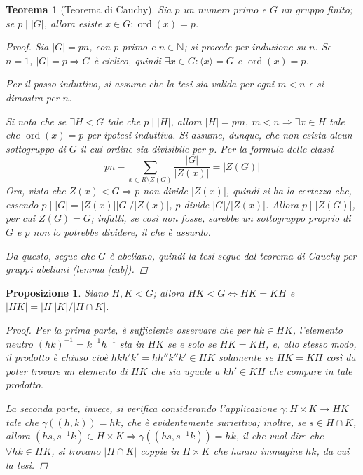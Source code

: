 \documentclass[11pt]{scrartcl}
\theoremstyle{style1}
\newtheorem{teorema}{Teorema}[section]
\newtheorem{prop}{Proposizione}[section]
\numberwithin{equation}{subsection}
\begin{document}
\begin{teorema}
	[Teorema di Cauchy]
	Sia $p$ un numero primo e $G$ un gruppo finito; se $p  \mid |G|$, allora esiste $x \in G : \operatorname{ord}(x) = p $.
	\begin{proof}
		Sia $|G| = pn$, con $p$ primo e $n \in \mathbb{N}$; si procede per induzione su $n$.
		Se $n=1$, $|G| = p \Rightarrow G$ \`e ciclico, quindi $\exists x \in G : \langle x \rangle=G$ e $\operatorname{ord}(x) = p$.

		Per il passo induttivo, si assume che la tesi sia valida per ogni $ m < n$ e si dimostra per $n$.

Si nota che se $\exists  H < G$ tale che $p  \mid  \lvert H \rvert $, allora $|H|=pm , \ m < n \Rightarrow \exists x \in H$ tale che $\operatorname{ord}(x) =p$ per ipotesi induttiva.
Si assume, dunque, che non esista alcun sottogruppo di $G$ il cui ordine sia divisibile per $p$.
Per la formula delle classi
\[
pn - \sum_{x \in R\setminus Z(G)}^{} \frac{\lvert G \rvert }{|Z(x)|} = \lvert Z(G) \rvert 
\] 
Ora, visto che $Z(x) < G \Rightarrow p$ non divide $|Z(x)|$, quindi si ha la certezza che, essendo $p  \mid |G| = |Z(x)| |G|/|Z(x)|$, $p$ divide $|G|/|Z(x)|$. 
Allora $p  \mid  |Z(G)|$, per cui $Z(G) =G$; infatti, se cos\`i non fosse, sarebbe un sottogruppo proprio di $G$ e $p$ non lo potrebbe dividere, il che \`e assurdo.

Da questo, segue che $G$ \`e abeliano, quindi la tesi segue dal teorema di Cauchy per gruppi abeliani (lemma \ref{cab}).
	\end{proof}
\end{teorema}
\begin{prop}\label{tgen}
Siano $H,K < G$; allora $HK < G \iff HK = KH$ e $\lvert HK \rvert = \lvert H \rvert \lvert K \rvert / \lvert H \cap K \rvert $.
\begin{proof}
Per la prima parte, \`e sufficiente osservare che per $hk \in HK$, l'elemento neutro $(hk)^{-1} = k^{-1} h^{-1} $ sta in $HK$ se e solo se $HK = KH$, e, allo stesso modo, il prodotto \`e chiuso cio\`e $hkh'k' = hh''k''k' \in HK$ solamente se $HK = KH$ cos\`i da poter trovare un elemento di $HK$ che sia uguale a $kh'\in KH$ che compare in tale prodotto.

La seconda parte, invece, si verifica considerando l'applicazione $\gamma: H \times K\to HK$ tale che $\gamma((h,k)) = hk$, che \`e evidentemente suriettiva; inoltre, se $s \in H \cap K$, allora $(hs,s^{-1}k) \in H \times K\Rightarrow \gamma ((hs,s^{-1}k)) = hk$, il che vuol dire che $\forall hk \in HK$, si trovano $|H\cap K|$ coppie in $H \times K$ che hanno immagine $hk$, da cui la tesi.
\end{proof}
\end{prop}
\end{document}
